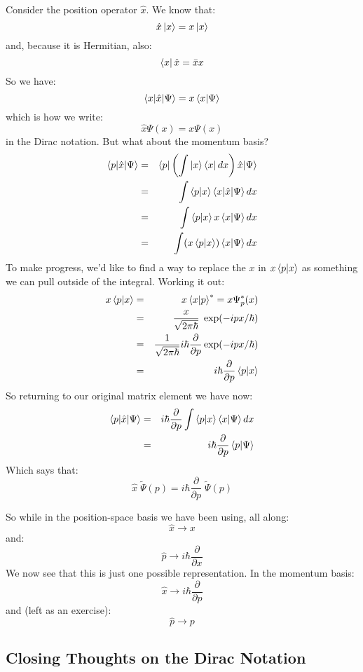 \documentclass[12pt]{book}
\begin{document}
Consider the position operator $\hat{x}$.  We know that:
$$\hat{x} \ket{x} = x \ket{x}$$
and, because it is Hermitian, also:
$$\bra{x} \hat{x} = \bar{x} x$$
So we have:
$$\braket{x|\hat{x}|\Psi} = x \braket{x|\Psi}$$
which is how we write:
$$\hat{x} \Psi(x) = x \Psi(x)$$
in the Dirac notation.  But what about the momentum basis?  
\begin{eqnarray*}
\braket{p|\hat{x}|\Psi} &=& \braket{p|\left( \int \ket{x}\bra{x}dx \right)\hat{x}|\Psi} \\
&=& \int \braket{p|x}\braket{x|\hat{x}|\Psi} dx\\
&=& \int \braket{p|x}x\braket{x|\Psi} dx\\
&=& \int (x\braket{p|x})\braket{x|\Psi} dx\\
\end{eqnarray*}
To make progress, we'd like to find a way to replace the $x$ in $x\braket{p|x}$ as something we can pull outside of the integral.  Working it out:
\begin{eqnarray*}
  x \braket{p|x} &=& x \braket{x|p}^* = x \Psi_p^*(x) \\
  &=& \frac{x}{\sqrt{2\pi\hbar}} \; \exp(-ipx/\hbar)\\
  &=& \frac{1}{\sqrt{2\pi\hbar}} i\hbar\frac{\partial}{\partial p} \exp(-ipx/\hbar)\\
  &=& i\hbar\frac{\partial}{\partial p} \braket{p|x}\\
\end{eqnarray*}
So returning to our original matrix element we have now:
\begin{eqnarray*}
 \braket{p|\hat{x}|\Psi} &=& i\hbar\frac{\partial}{\partial p} \int \braket{p|x}\braket{x|\Psi} dx\\
&=& i\hbar \frac{\partial}{\partial p} \braket{p|\Psi}
\end{eqnarray*}
Which says that:
$$\hat{x} \; \widetilde{\Psi}(p) = i \hbar \frac{\partial}{\partial p} \; \widetilde{\Psi}(p) $$

So while in the position-space basis we have been using, all along:
$$\hat{x} \longrightarrow x$$
and:
$$\hat{p} \longrightarrow i\hbar\frac{\partial}{\partial x}$$
We now see that this is just one possible representation.  In the momentum basis:
$$\hat{x} \longrightarrow i\hbar \frac{\partial}{\partial p} $$
and (left as an exercise):
$$\hat{p} \longrightarrow p$$

\subsection{Closing Thoughts on the Dirac Notation}
\end{document}

